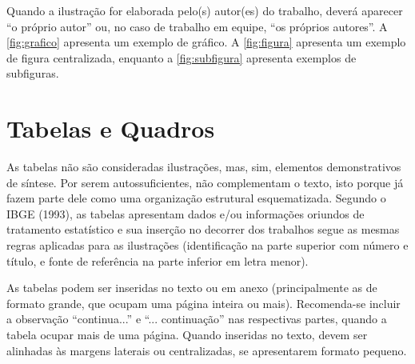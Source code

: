 \documentclass[12pt,oneside,a4paper,chapter=TITLE,section=TITLE,sumario
=tradicional]{abntex2}
\begin{document}
Quando a ilustração for elaborada pelo(s) autor(es) do trabalho, deverá 
aparecer ``o próprio autor'' ou, no caso de trabalho em equipe, ``os próprios 
autores''. A \autoref{fig:grafico} apresenta um exemplo de gráfico. A 
\autoref{fig:figura} apresenta um exemplo de figura centralizada, enquanto a 
\autoref{fig:subfigura} apresenta exemplos de subfiguras.

\begin{grafico}[htb]
\end{grafico}

\begin{figure}[htb]
\end{figure}

\begin{figure}[htb]
    \hfil
    \hfil
    
    \hfil
    \hfil
    
\end{figure}

\section{Tabelas e Quadros}
\label{sec:tabelas}

As tabelas não são consideradas ilustrações, mas, sim, elementos demonstrativos 
de síntese. Por serem autossuficientes, não complementam o texto, isto porque 
já fazem parte dele como uma organização estrutural esquematizada. Segundo o 
IBGE (1993), as tabelas apresentam dados e/ou informações oriundos de 
tratamento estatístico e sua inserção no decorrer dos trabalhos segue as mesmas 
regras aplicadas para as ilustrações (identificação na parte superior com 
número e título, e fonte de referência na parte inferior em letra menor).

As tabelas podem ser inseridas no texto ou em anexo (principalmente as de 
formato grande, que ocupam uma página inteira ou mais). Recomenda-se incluir a 
observação ``continua...'' e ``... continuação'' nas respectivas partes, quando 
a tabela ocupar mais de uma página. Quando inseridas no texto, devem ser 
alinhadas às margens laterais ou centralizadas, se apresentarem formato pequeno.
\end{document}
